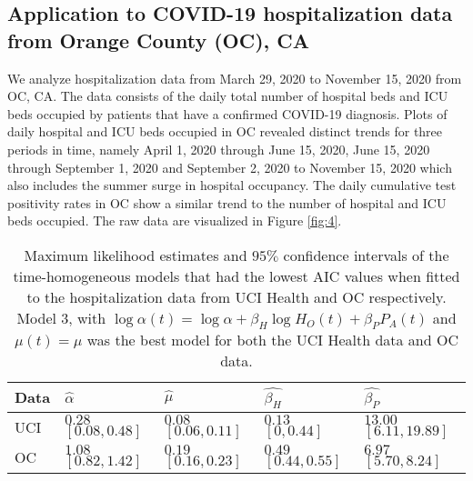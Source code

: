 \documentclass{article}
\begin{document}
\subsection{Application to COVID-19 hospitalization data from Orange County (OC), CA}
\label{Application to COVID-19 hospitalization data from Orange County, CA}

We analyze hospitalization data from March 29, 2020 to November 15, 2020 from OC, CA. The data consists of the daily total number of hospital beds and ICU beds occupied by patients that have a confirmed COVID-19 diagnosis. Plots of daily hospital and ICU beds occupied in OC revealed distinct trends for three periods in time, namely April 1, 2020 through June 15, 2020, June 15, 2020 through September 1, 2020 and September 2, 2020 to November 15, 2020 which also includes the summer surge in hospital occupancy. The daily cumulative test positivity rates in OC show a similar trend to the number of hospital and ICU beds occupied. The raw data are visualized in Figure \ref{fig:4}.

\begin{table}[h]
\centering
\begin{tabular}{p{8mm} p{18mm} p{20mm} p{20mm} p{20mm}}
Data  & $\hat{\alpha}$ & $\hat{\mu}$ & $\hat{\beta_{H}}$ & $\hat{\beta_{P}}$ \\ \hline
UCI & $0.28$ $[0.08, 0.48]$ & $0.08$ $[0.06, 0.11]$ & $0.13$ $[0, 0.44]$ & $13.00$ $[6.11,19.89]$\\ \hline
OC  & $1.08$ \newline $[0.82,1.42]$ & $0.19$ $[0.16,0.23]$ & $0.49$ $[0.44,0.55]$ & $6.97$ $[5.70,8.24]$\\ \hline
\end{tabular}
\vspace{2mm}
\caption{Maximum likelihood estimates and $95\%$ confidence intervals of the time-homogeneous models that had the lowest AIC values when fitted to the hospitalization data from UCI Health and OC respectively. Model $3$, with $\log{\alpha(t)} = \log{\alpha} + \beta_{H} \log{H_{O}(t)} + \beta_{P}P_{A}(t)$ and $\mu(t) = \mu$ was the best model for both the UCI Health data and OC data.}
\label{tab2}
\end{table}
\end{document}
